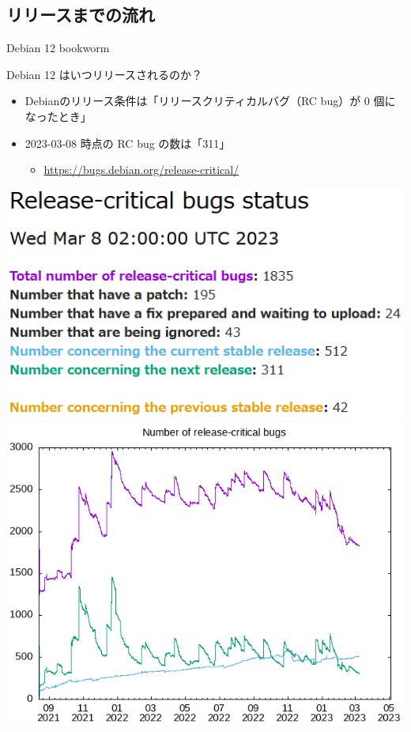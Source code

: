 \subsection{リリースまでの流れ}

\begin{frame}{Debian 12 bookworm}%

Debian 12 はいつリリースされるのか？

\begin{itemize}
\item Debianのリリース条件は「リリースクリティカルバグ（RC bug）が 0 個になったとき」
\item 2023-03-08 時点の RC bug の数は「311」
  \begin{itemize}
  \item \url{https://bugs.debian.org/release-critical/}
  \end{itemize}
\end{itemize}

\begin{center}
  \includegraphics[width=0.45\hsize]{image202303/debian-rcbug-1_20230308.png}
  \includegraphics[width=0.45\hsize]{image202303/debian-rcbug-2_20230308.png}
\end{center}

\end{frame}


